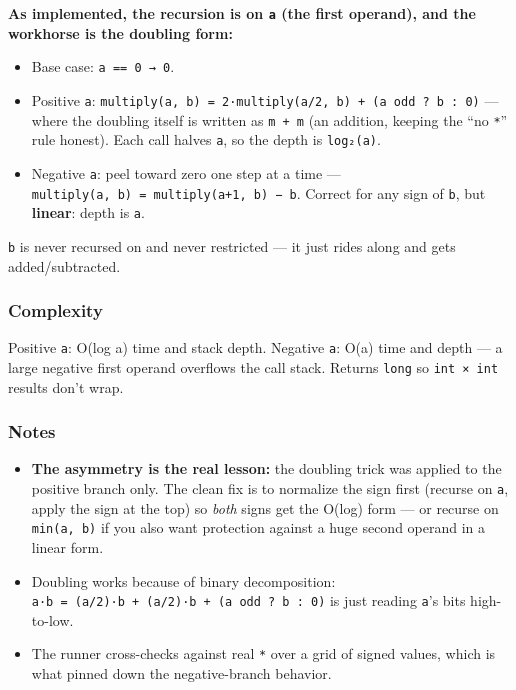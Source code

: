 \documentclass[
  10pt,
  letterpaper,
  onecolumn]{article}
\providecommand{\tightlist}{%
  \setlength{\itemsep}{0pt}\setlength{\parskip}{0pt}}
\begin{document}
\textbf{As implemented, the recursion is on \texttt{a} (the first
operand), and the workhorse is the doubling form:}

\begin{itemize}
\tightlist
\item
  Base case: \texttt{a\ ==\ 0\ →\ 0}.
\item
  Positive \texttt{a}:
  \texttt{multiply(a,\ b)\ =\ 2·multiply(a/2,\ b)\ +\ (a\ odd\ ?\ b\ :\ 0)}
  --- where the doubling itself is written as \texttt{m\ +\ m} (an
  addition, keeping the ``no \texttt{*}'' rule honest). Each call halves
  \texttt{a}, so the depth is \texttt{log₂(a)}.
\item
  Negative \texttt{a}: peel toward zero one step at a time ---
  \texttt{multiply(a,\ b)\ =\ multiply(a+1,\ b)\ −\ b}. Correct for any
  sign of \texttt{b}, but \textbf{linear}: depth is
  \texttt{\textbar{}a\textbar{}}.
\end{itemize}

\texttt{b} is never recursed on and never restricted --- it just rides
along and gets added/subtracted.

\hypertarget{complexity-1}{%
\subsubsection{Complexity}\label{complexity-1}}

Positive \texttt{a}: O(log a) time and stack depth. Negative \texttt{a}:
O(\textbar a\textbar) time and depth --- a large negative first operand
overflows the call stack. Returns \texttt{long} so \texttt{int\ ×\ int}
results don't wrap.

\hypertarget{notes}{%
\subsubsection{Notes}\label{notes}}

\begin{itemize}
\tightlist
\item
  \textbf{The asymmetry is the real lesson:} the doubling trick was
  applied to the positive branch only. The clean fix is to normalize the
  sign first (recurse on \texttt{\textbar{}a\textbar{}}, apply the sign
  at the top) so \emph{both} signs get the O(log) form --- or recurse on
  \texttt{min(\textbar{}a\textbar{},\ \textbar{}b\textbar{})} if you
  also want protection against a huge second operand in a linear form.
\item
  Doubling works because of binary decomposition:
  \texttt{a·b\ =\ (a/2)·b\ +\ (a/2)·b\ +\ (a\ odd\ ?\ b\ :\ 0)} is just
  reading \texttt{a}'s bits high-to-low.
\item
  The runner cross-checks against real \texttt{*} over a grid of signed
  values, which is what pinned down the negative-branch behavior.
\end{itemize}
\end{document}
